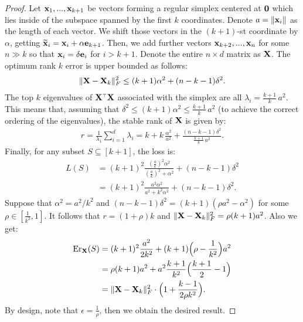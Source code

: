 \documentclass{article}
\begin{document}
\begin{proof}
	Let $\mathbf x_1,...,\mathbf x_{k+1}$ be vectors forming a regular simplex centered
	at $\mathbf 0$ which lies inside of the subspace spanned by the first $k$
	coordinates. Denote $a=\|\mathbf x_i\|$ as the length of each vector. We
	shift those vectors in the $(k+1)$-st coordinate by $\alpha$, getting
	$\widetilde{\mathbf x}_i=\mathbf x_i+\alpha\mathbf e_{k+1}$. Then, we add further vectors
	$\mathbf x_{k+2},...,\mathbf x_n$ for some $n\gg k$ so that $\mathbf x_i=\delta\mathbf e_{i}$ for
	$i>k+1$. Denote the entire $n\times d$ matrix as $\mathbf X$. The optimum
	rank $k$ error is upper bounded as follows: 
	\begin{align*}
	\|\mathbf X - \mathbf X_k\|_F^2 \leq (k+1)\alpha^2 + (n-k-1)\delta^2.
	\end{align*}
	The top $k$ eigenvalues of $\X^\top\X$ associated with the simplex are all
	$\lambda_i=\frac{k+1}{k}\,a^2$. This means that,
	assuming that $\delta^2\leq(k+1)\alpha^2\leq \frac{k+1}{k}\,a^2$ (to
	achieve the correct ordering of the eigenvalues), the
	stable rank of $\mathbf X$ is given by:
	\begin{align*}
	r = \frac1{\lambda_1}\sum_{i=1}^d\lambda_i = k +
	k\,\frac{\alpha^2}{a^2} + \frac{(n-k-1)\delta^2}{\frac{k+1}k\,a^2}.
	\end{align*}
	Finally, for any subset $S\subseteq[k+1]$, the loss is:
	\begin{align*}
	L(S) &= (k+1)^2\frac{(\frac ak)^2\alpha^2}{(\frac ak)^2+\alpha^2} +
	(n-k-1)\delta^2\\
	&=(k+1)^2\frac{a^2\alpha^2}{a^2+k^2\alpha^2} +
	(n-k-1)\delta^2.
	\end{align*}
	Suppose that $\alpha^2=a^2/k^2$ and $(n-k-1)\delta^2 = (k+1)(\rho a^2-\alpha^2)$ for some
	$\rho\in[\frac1{k^2},1]$. It follows that $r=(1+\rho)k$ and
	$\|\mathbf X - \mathbf X_k\|_F^2=\rho(k+1)a^2$. Also we get:
	\begin{align*}
	\mathrm{Er}_{\mathbf X}(S)&=  (k+1)^2 \frac{a^2}{2k^2} + (k+1)\Big(\rho-\frac1{k^2}\Big) a^2\\
	&=\rho(k+1)a^2 + a^2\frac{k+1}{k^2}\Big(\frac{k+1}{2} - 1\Big)\\
	&=\|\mathbf X - \mathbf X_k\|_F^2\cdot\Big(1 + \frac{k-1}{2\rho k^2}\Big).
	\end{align*}
	By design, note that $\epsilon = \frac{1}{\rho}$, then we obtain the desired result. 
	\end{proof}
\end{document}

